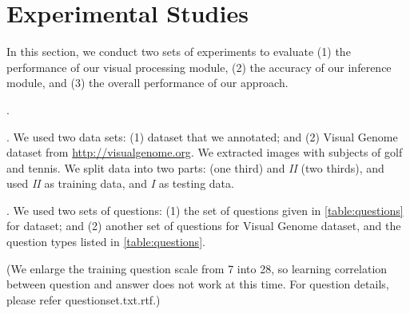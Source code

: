 
\section{Experimental Studies}
\label{sec-expt}

In this section, we conduct two sets of experiments to evaluate (1) the performance of our visual processing module, (2) the accuracy of our inference module, and (3) the overall performance of our approach.

. %

. We used two data sets: (1)  dataset that we annotated; and (2) Visual Genome dataset from \url{http://visualgenome.org}. We extracted images with subjects of golf and tennis. We split  data into two parts: {\color{red}{\em  I} (one third) and {\em II} (two thirds), and used {\em II} as training data, and {\em I} as testing data}. 

. We used two sets of questions: (1) the set of questions given in \autoref{table:questions} for  dataset; and (2) another set of questions for Visual Genome dataset, and the question types listed in \autoref{table:questions}. 

(We enlarge the training question scale from 7 into 28, so learning correlation between question and answer does not work at this time. For question details, please refer {\color{red}questionset.txt.rtf}.)


